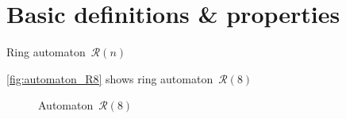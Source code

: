\chapter{Basic definitions \& properties}

\begin{defn}
    Ring automaton~${\mathcal{R}(n)}$
\end{defn}

\begin{example}
    \autoref*{fig:automaton_R8} shows ring automaton~${\mathcal{R}(8)}$
\end{example}

\begin{figure}[h]
    \centering
        
    \caption{Automaton~${\mathcal{R}(8)}$}\label{fig:automaton_R8}
\end{figure}